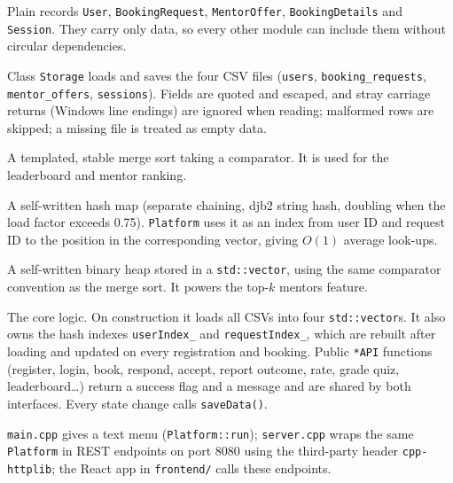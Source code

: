\documentclass[11pt,a4paper]{article}
\begin{document}
\begin{description}[leftmargin=1.5cm,style=nextline]
\item[Models (\texttt{models.h})] Plain records \texttt{User}, \texttt{BookingRequest}, \texttt{MentorOffer}, \texttt{BookingDetails} and \texttt{Session}. They carry only data, so every other module can include them without circular dependencies.

\item[Storage (\texttt{storage.h/.cpp})] Class \texttt{Storage} loads and saves the four CSV files (\texttt{users}, \texttt{booking\_requests}, \texttt{mentor\_offers}, \texttt{sessions}). Fields are quoted and escaped, and stray carriage returns (Windows line endings) are ignored when reading; malformed rows are skipped; a missing file is treated as empty data.

\item[Sorting (\texttt{sorting.h})] A templated, stable merge sort taking a comparator. It is used for the leaderboard and mentor ranking.

\item[Hash map (\texttt{hashmap.h})] A self-written hash map (separate chaining, djb2 string hash, doubling when the load factor exceeds 0.75). \texttt{Platform} uses it as an index from user ID and request ID to the position in the corresponding vector, giving $O(1)$ average look-ups.

\item[Priority queue (\texttt{priority\_queue.h})] A self-written binary heap stored in a \texttt{std::vector}, using the same comparator convention as the merge sort. It powers the top-$k$ mentors feature.

\item[Platform (\texttt{platform.h/.cpp})] The core logic. On construction it loads all CSVs into four \texttt{std::vector}s. It also owns the hash indexes \texttt{userIndex\_} and \texttt{requestIndex\_}, which are rebuilt after loading and updated on every registration and booking. Public \texttt{*API} functions (register, login, book, respond, accept, report outcome, rate, grade quiz, leaderboard\ldots) return a success flag and a message and are shared by both interfaces. Every state change calls \texttt{saveData()}.

\item[Interfaces] \texttt{main.cpp} gives a text menu (\texttt{Platform::run}); \texttt{server.cpp} wraps the same \texttt{Platform} in REST endpoints on port 8080 using the third-party header \texttt{cpp-httplib}; the React app in \texttt{frontend/} calls these endpoints.
\end{description}
\end{document}
